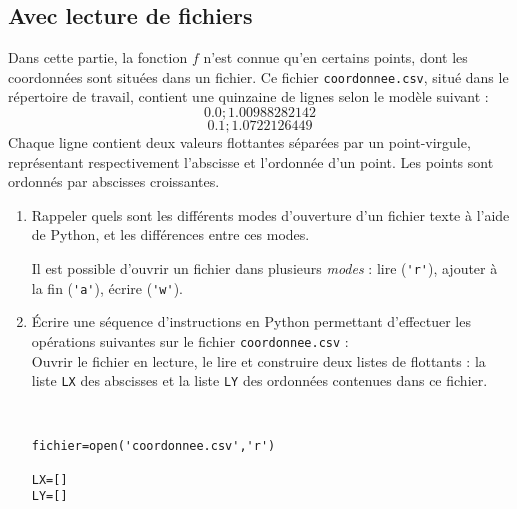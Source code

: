 \subsection{Avec lecture de fichiers}
Dans cette partie, la fonction $f$ n'est connue qu'en certains points, dont les coordonn\' ees sont situ\' ees dans un fichier. Ce fichier \texttt{coordonnee.csv}, situé dans le répertoire de travail, contient une quinzaine de lignes selon le modèle suivant :
\[0.0;1.00988282142\]
\[0.1;1.0722126449\]
Chaque ligne contient deux valeurs flottantes séparées par un point-virgule, représentant respectivement l'abscisse et l'ordonnée d'un point. Les points sont ordonnés par abscisses croissantes.
\begin{enumerate}
\item Rappeler quels sont les différents modes d'ouverture d'un fichier texte à l'aide de Python, et les différences entre ces modes.
\begin{solution}
Il est possible d'ouvrir un fichier dans plusieurs \textit{modes} : lire (\verb|'r'|), ajouter à la fin (\verb|'a'|), écrire (\verb|'w'|). 
\end{solution}
\item \'Ecrire une séquence d'instructions en Python permettant d'effectuer les opérations suivantes sur le fichier \texttt{coordonnee.csv} :\\
Ouvrir le fichier en lecture, le lire et construire deux listes de flottants : la liste \verb?LX? des abscisses et la liste \verb?LY? des ordonnées contenues dans ce fichier.
\begin{solution}~\\
\vspace{-1cm}
\begin{verbatim}
fichier=open('coordonnee.csv','r')

LX=[]
LY=[]


\end{verbatim}
\end{solution}
\end{enumerate}
